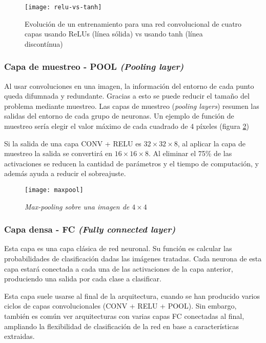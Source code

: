 \begin{figure}
    \centering
    \caption{Evolución de un entrenamiento para una red convolucional de cuatro capas usando ReLUs (línea sólida) vs usando tanh (línea discontínua) \parencite{krizhevsky2012imagenet}}
  \label{relu-vs-tanh}
  \texttt{[image: relu-vs-tanh]}
\end{figure}

\subsubsection{Capa de muestreo - POOL \textit{(Pooling layer)}}

Al usar convoluciones en una imagen, la información del entorno de cada punto queda difumnada y redundante. Gracias a esto se puede reducir el tamaño del problema mediante muestreo. Las capas de muestreo (\textit{pooling layers}) resumen las salidas del entorno de cada grupo de neuronas. Un ejemplo de función de muestreo sería elegir el valor máximo de cada cuadrado de 4 píxeles (figura \ref{maxpool})

Si la salida de una capa CONV + RELU es $32 \times 32 \times 8$, al aplicar la capa de muestreo la salida se convertirá en $16 \times 16 \times 8$. Al eliminar el 75\% de las activaciones se reducen la cantidad de parámetros y el tiempo de computación, y además ayuda a reducir el sobreajuste.

\begin{figure}
    \centering
    \caption{\textit{Max-pooling sobre una imagen de $4\times4$}}
  \label{maxpool}
  \texttt{[image: maxpool]}
\end{figure}

\subsubsection{Capa densa - FC \textit{(Fully connected layer)}}

Esta capa es una capa clásica de red neuronal. Su función es calcular las probabilidades de clasificación dadas las imágenes tratadas. Cada neurona de esta capa estará conectada a cada una de las activaciones de la capa anterior, produciendo una salida por cada clase a clasificar.

Esta capa suele usarse al final de la arquitectura, cuando se han producido varios ciclos de capas convolucionales (CONV + RELU + POOL). Sin embargo, también es común ver arquitecturas con varias capas FC conectadas al final, ampliando la flexibilidad de clasificación de la red en base a características extraidas.


